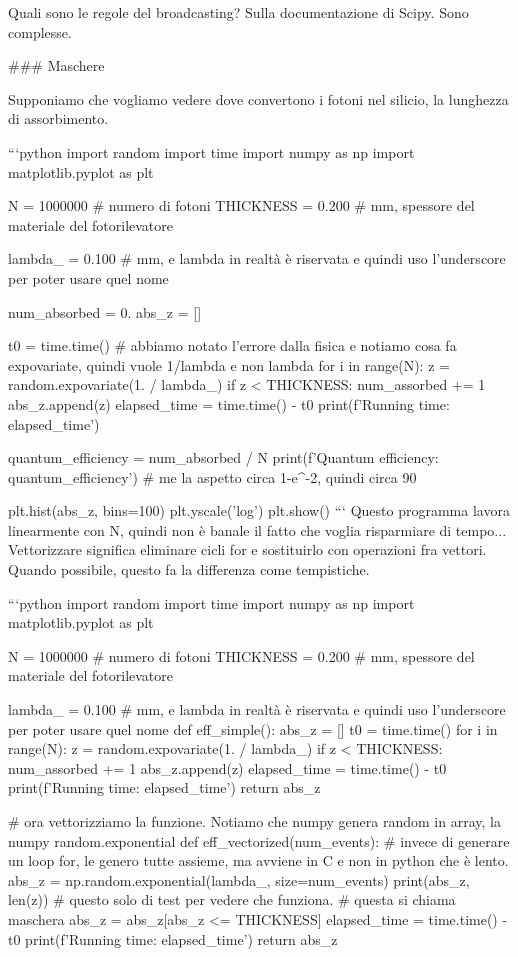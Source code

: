 \documentclass[10pt, a4paper, twosided, titlepage, draft]{book}
\begin{document}
Quali sono le regole del broadcasting? Sulla documentazione di Scipy. Sono complesse.

### Maschere

Supponiamo che vogliamo vedere dove convertono i fotoni nel silicio, la lunghezza di assorbimento.

```python
import random
import time
import numpy as np
import matplotlib.pyplot as plt

N = 1000000 # numero di fotoni
THICKNESS = 0.200 # mm, spessore del materiale del fotorilevatore

lambda_ = 0.100 # mm, e lambda in realtà è riservata e quindi uso l'underscore per poter usare quel nome

num_absorbed = 0.
abs_z = []

t0 = time.time()
# abbiamo notato l'errore dalla fisica e notiamo cosa fa expovariate, quindi vuole 1/lambda e non lambda
for i in range(N):
z = random.expovariate(1. / lambda_)
if z < THICKNESS:
num_assorbed += 1
abs_z.append(z)
elapsed_time = time.time() - t0
print(f'Running time: {elapsed_time}')

quantum_efficiency = num_absorbed / N
print(f'Quantum efficiency: {quantum_efficiency}')
# me la aspetto circa 1-e^-2, quindi circa 90%

plt.hist(abs_z, bins=100)
plt.yscale('log')
plt.show()
```
Questo programma lavora linearmente con N, quindi non è banale il fatto che voglia risparmiare di tempo... 
Vettorizzare significa eliminare cicli for e sostituirlo con operazioni fra vettori. Quando possibile, questo fa la differenza come tempistiche.

```python
import random
import time
import numpy as np
import matplotlib.pyplot as plt

N = 1000000 # numero di fotoni
THICKNESS = 0.200 # mm, spessore del materiale del fotorilevatore

lambda_ = 0.100 # mm, e lambda in realtà è riservata e quindi uso l'underscore per poter usare quel nome
def eff_simple():
abs_z = []
t0 = time.time()
for i in range(N):
z = random.expovariate(1. / lambda_)
if z < THICKNESS:
num_assorbed += 1
abs_z.append(z)
elapsed_time = time.time() - t0
print(f'Running time: {elapsed_time}')
return abs_z

# ora vettorizziamo la funzione. Notiamo che numpy genera random in array, la numpy random.exponential
def eff_vectorized(num_events):
# invece di generare un loop for, le genero tutte assieme, ma avviene in C e non in python che è lento.
abs_z = np.random.exponential(lambda_, size=num_events)
print(abs_z, len(z)) # questo solo di test per vedere che funziona.
# questa si chiama maschera
abs_z = abs_z[abs_z <= THICKNESS]
elapsed_time = time.time() - t0
print(f'Running time: {elapsed_time}')
return abs_z
\end{document}
